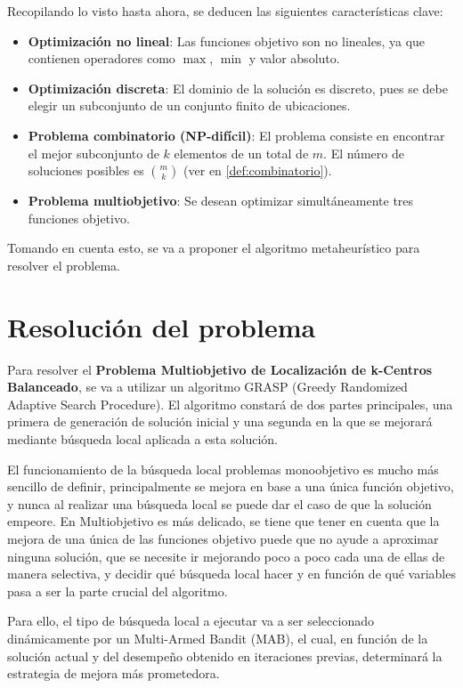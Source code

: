 \documentclass[12pt,a4paper]{book}
\begin{document}
Recopilando lo visto hasta ahora, se deducen las siguientes características clave:

\begin{itemize}
    \item \textbf{Optimización no lineal}: Las funciones objetivo son no lineales, ya que contienen operadores como $\max$, $\min$ y valor absoluto.
    
    \item \textbf{Optimización discreta}: El dominio de la solución es discreto, pues se debe elegir un subconjunto de un conjunto finito de ubicaciones.
    
    \item \textbf{Problema combinatorio (NP-difícil)}: El problema consiste en encontrar el mejor subconjunto de $k$ elementos de un total de $m$. El número de soluciones posibles es $\binom{m}{k}$ (ver en \ref{def:combinatorio}).
    
    \item \textbf{Problema multiobjetivo}: Se desean optimizar simultáneamente tres funciones objetivo.
\end{itemize}

Tomando en cuenta esto, se va a proponer el algoritmo metaheurístico para resolver el problema.


\chapter{Resolución del problema}
Para resolver el \textbf{Problema Multiobjetivo de Localización de k-Centros Balanceado}, se va a utilizar un algoritmo GRASP (Greedy Randomized Adaptive Search Procedure).
El algoritmo constará de dos partes principales, una primera de generación de solución inicial y una segunda en la que se mejorará mediante búsqueda local aplicada a esta solución.

El funcionamiento de la búsqueda local problemas monoobjetivo es mucho más sencillo de definir, principalmente se mejora en base a una única función objetivo, y nunca al realizar una búsqueda local se puede dar el caso de que la solución empeore. En Multiobjetivo es más delicado,
se tiene que tener en cuenta que la mejora de una única de las funciones objetivo puede que no ayude a aproximar ninguna solución, que se necesite ir mejorando poco a poco cada una de ellas de manera selectiva, y decidir qué búsqueda local hacer y en función de qué variables pasa
a ser la parte crucial del algoritmo.

Para ello, el tipo de búsqueda local a ejecutar va a ser seleccionado dinámicamente por un Multi-Armed Bandit (MAB), el cual, en función de la solución actual y del desempeño obtenido en iteraciones previas, determinará la estrategia de mejora más prometedora.
\end{document}
